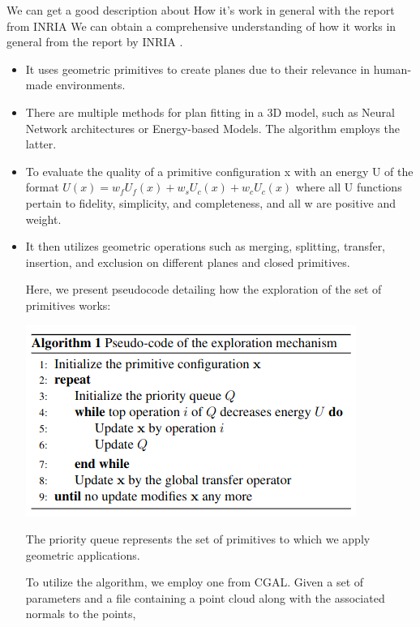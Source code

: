 \documentclass{article}
\begin{document}
We can get a good description about How it's work in general with the report from INRIA 
\cite{yu:hal-03621896}
We can obtain a comprehensive understanding of how it works in general from the report by INRIA \cite{yu:hal-03621896}.

\begin{itemize}
\item It uses geometric primitives to create planes due to their relevance in human-made environments.
\item There are multiple methods for plan fitting in a 3D model, such as Neural Network architectures or Energy-based Models. The algorithm employs the latter.
\item To evaluate the quality of a primitive configuration x with an energy U of the format
  \newline 
  $ U(x) = w_f U_f(x) + w_s U_c(x) + w_c U_c(x)$
  \newline
  where all U functions pertain to fidelity, simplicity, and completeness, and all w are positive and weight.
  \item It then utilizes geometric operations such as merging, splitting, transfer, insertion, and exclusion on different planes and closed primitives.

  Here, we present pseudocode detailing how the exploration of the set of primitives works:
\begin{center}
  \includegraphics[scale =  0.5]{../../images/Pseudo_code_exploration.png}
\end{center}
The priority queue represents the set of primitives to which we apply geometric applications.

To utilize the algorithm, we employ one from CGAL. Given a set of parameters and a file containing a point cloud along
 with the associated normals to the points,


\end{itemize}
\end{document}
